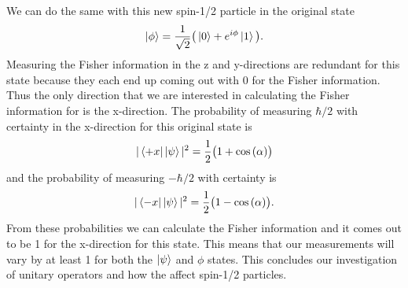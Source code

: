 \documentclass[twocolumn]{article}
\begin{document}
We can do the same with this new spin-1/2 particle in the original state
\begin{equation}
\ket{\phi}=\frac{1}{\sqrt{2}}\big(\ket{0}+e^{i\phi}\ket{1}\big).
\end{equation}
Measuring the Fisher information in the z and y-directions are redundant for this state because they each end up coming out with 0 for the Fisher information. Thus the only direction that we are interested in calculating the Fisher information for is the x-direction. The probability of measuring $\hbar/2$ with certainty in the x-direction for this original state is
\begin{equation}
|\bra{+x}\ket{\psi}|^2=\frac{1}{2}\big(1+\cos{(\alpha)}\big)
\end{equation}
and the probability of measuring $-\hbar/2$ with certainty is
\begin{equation}
|\bra{-x}\ket{\psi}|^2=\frac{1}{2}\big(1-\cos{(\alpha)}\big).
\end{equation}
From these probabilities we can calculate the Fisher information and it comes out to be 1 for the x-direction for this state. This means that our measurements will vary by at least 1 for both the $\ket{\psi}$ and $\phi$ states. This concludes our investigation of unitary operators and how the affect spin-1/2 particles.
\end{document}

